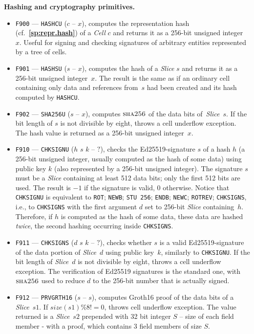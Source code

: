 \documentclass[12pt,oneside]{article}
\def\makepoint#1{\medbreak\noindent{\bf #1.\ }}
\def\nxsubpoint{\refstepcounter{subsubsection}%
    \smallbreak\makepoint{\thesubsubsection}}
\def\refpoint#1{{\rm\textbf{\ref{#1}}}}
\let\ptref=\refpoint
\def\emb#1{\textbf{#1.}}
\def\opsc#1{\operatorname{\textsc{#1}}}
\def\Sha{\opsc{sha256}}
\begin{document}
\nxsubpoint\emb{Hashing and cryptography primitives}
\begin{itemize}
\item {\tt F900} --- {\tt HASHCU} ($c$ -- $x$), computes the representation hash (cf.~\ptref{sp:repr.hash}) of a {\em Cell\/} $c$ and returns it as a 256-bit unsigned integer~$x$. Useful for signing and checking signatures of arbitrary entities represented by a tree of cells.
\item {\tt F901} --- {\tt HASHSU} ($s$ -- $x$), computes the hash of a {\em Slice\/} $s$ and returns it as a 256-bit unsigned integer~$x$. The result is the same as if an ordinary cell containing only data and references from~$s$ had been created and its hash computed by {\tt HASHCU}.
\item {\tt F902} --- {\tt SHA256U} ($s$ -- $x$), computes $\Sha$ of the data bits of~{\em Slice\/}~$s$. If the bit length of $s$ is not divisible by eight, throws a cell underflow exception. The hash value is returned as a 256-bit unsigned integer~$x$.
\item {\tt F910} --- {\tt CHKSIGNU} ($h$ $s$ $k$ -- $?$), checks the Ed25519-signature $s$ of a hash $h$ (a 256-bit unsigned integer, usually computed as the hash of some data) using public key $k$ (also represented by a 256-bit unsigned integer). The signature $s$ must be a {\em Slice\/} containing at least 512 data bits; only the first 512 bits are used. The result is $-1$ if the signature is valid, $0$ otherwise. Notice that {\tt CHKSIGNU} is equivalent to {\tt ROT}; {\tt NEWB}; {\tt STU 256}; {\tt ENDB}; {\tt NEWC}; {\tt ROTREV}; {\tt CHKSIGNS}, i.e., to {\tt CHKSIGNS} with the first argument $d$ set to 256-bit {\em Slice} containing~$h$. Therefore, if $h$ is computed as the hash of some data, these data are hashed {\em twice}, the second hashing occurring inside {\tt CHKSIGNS}.
\item {\tt F911} --- {\tt CHKSIGNS} ($d$ $s$ $k$ -- $?$), checks whether $s$ is a valid Ed25519-signature of the data portion of {\em Slice\/}~$d$ using public key~$k$, similarly to {\tt CHKSIGNU}. If the bit length of {\em Slice\/}~$d$ is not divisible by eight, throws a cell underflow exception. The verification of Ed25519 signatures is the standard one, with $\Sha$ used to reduce $d$ to the 256-bit number that is actually signed.
\item {\tt F912} --- {\tt PRVGRTH16} ($s$ -- $s$), computes Groth16 proof of the data bits of a {\em Slice\/}~$s1$. If
$size(s1) \% 8 != 0$, throws cell underflow exception. The value returned is a {\em Slice\/}~$s2$ prepended with 32 bit integer $S$ – size of each field member - with a proof, which contains 3 field members of size $S$.

\end{itemize}
\end{document}
